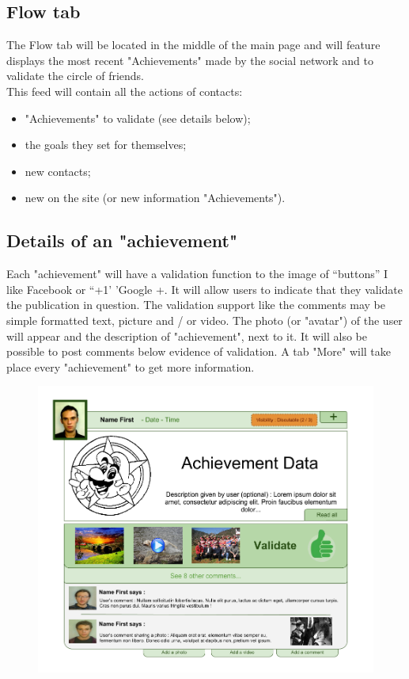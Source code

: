 \documentclass {life-en}
\begin{document}
\subsection{Flow tab}

The Flow tab will be located in the middle of the main page and will feature displays the most recent "Achievements" made by the social network and to validate the circle of friends.\\

This feed will contain all the actions of contacts:

\begin{itemize}
  \item "Achievements" to validate (see details below);
  \item the goals they set for themselves;
  \item new contacts;
  \item new on the site (or new information "Achievements").
\end{itemize}

\newpage

\subsection{Details of an "achievement"}

Each "achievement" will have a validation function to the image of ``buttons'' I like Facebook or ``+1' 'Google +. It will allow users to indicate that they validate the publication in question. The validation support like the comments may be simple formatted text, picture and / or video. The photo (or "avatar") of the user will appear and the description of "achievement", next to it. It will also be possible to post comments below evidence of validation. A tab "More" will take place every "achievement" to get more information.\\

\begin{figure} [H]
  \begin{center}
    \includegraphics [width = 15cm]{img/achievement.png}
  \end{center}
\end{figure}
\end{document}
